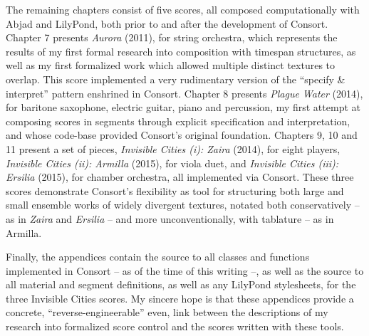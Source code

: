 The remaining chapters consist of five scores, all composed computationally
with Abjad and LilyPond, both prior to and after the development of Consort.
Chapter 7 presents \emph{Aurora} (2011), for string orchestra, which represents
the results of my first formal research into composition with timespan
structures, as well as my first formalized work which allowed multiple distinct
textures to overlap. This score implemented a very rudimentary version of the
\enquote{specify \& interpret} pattern enshrined in Consort. Chapter 8 presents
\emph{Plague Water} (2014), for baritone saxophone, electric guitar, piano and
percussion, my first attempt at composing scores in segments through explicit
specification and interpretation, and whose code-base provided Consort's
original foundation. Chapters 9, 10 and 11 present a set of pieces,
\emph{Invisible Cities (i): Zaira} (2014), for eight players, \emph{Invisible
Cities (ii): Armilla} (2015), for viola duet, and \emph{Invisible Cities (iii):
Ersilia} (2015), for chamber orchestra, all implemented via Consort. These
three scores demonstrate Consort's flexibility as tool for structuring both
large and small ensemble works of widely divergent textures, notated both
conservatively -- as in \emph{Zaira} and \emph{Ersilia} -- and more
unconventionally, with tablature -- as in Armilla.

Finally, the appendices contain the source to all classes and functions
implemented in Consort -- as of the time of this writing --, as well as the
source to all material and segment definitions, as well as any LilyPond
stylesheets, for the three Invisible Cities scores. My sincere hope is that
these appendices provide a concrete, \enquote{reverse-engineerable} even, link
between the descriptions of my research into formalized score control and the
scores written with these tools.

